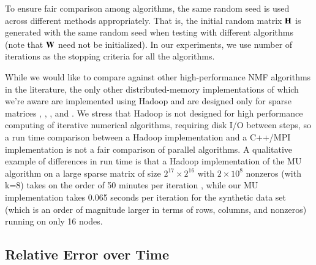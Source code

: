 
To ensure fair comparison among algorithms, the same random seed is used across different methods appropriately. 
That is, the initial random matrix $\mathbf{H}$ is generated with the same random seed when testing with 
different algorithms (note that $\mathbf{W}$ need not be initialized). 
In our experiments, we use number of iterations as the stopping criteria for all the algorithms.

While we would like to compare against other high-performance NMF algorithms in the literature, the only other distributed-memory implementations of which we're aware are implemented using Hadoop and are designed only for sparse matrices \cite{liao2014cloudnmf},
\cite{liu2010distributed}, \cite{gemulla2011large}, \cite{Yin2014} and \cite{Faloutsos2014}.
We stress that Hadoop is not designed for high performance computing of iterative numerical 
algorithms, requiring disk I/O between steps, so a run time comparison between a Hadoop 
implementation and a C++/MPI implementation is not a fair comparison of parallel algorithms.
A qualitative example of differences in run time is that a Hadoop implementation of the MU algorithm on 
a large sparse matrix of size $2^{17} \times 2^{16}$ with $2 \times {10^8}$ nonzeros (with k=8) 
takes on the order of 50 minutes per iteration \cite{liu2010distributed}, while our MU implementation 
takes 0.065 seconds per iteration for the synthetic data set (which is an order of magnitude larger in 
terms of rows, columns, and nonzeros) running on only 16 nodes. 



\subsection{Relative Error over Time} \label{sec:convergence}

